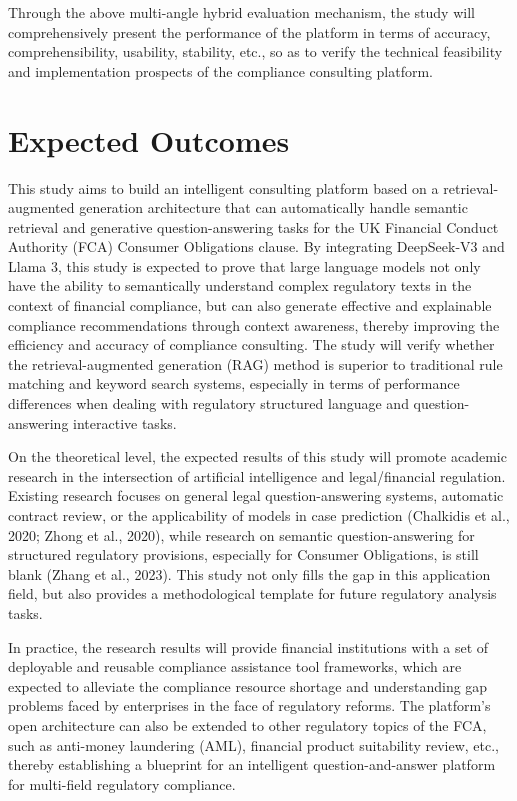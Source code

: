 \documentclass[a4paper,11pt]{article}
\begin{document}
Through the above multi-angle hybrid evaluation mechanism, the study will comprehensively present the performance of the platform in terms of accuracy, comprehensibility, usability, stability, etc., so as to verify the technical feasibility and implementation prospects of the compliance consulting platform.

\section{Expected Outcomes}

This study aims to build an intelligent consulting platform based on a retrieval-augmented generation architecture that can automatically handle semantic retrieval and generative question-answering tasks for the UK Financial Conduct Authority (FCA) Consumer Obligations clause. By integrating DeepSeek-V3 and Llama 3, this study is expected to prove that large language models not only have the ability to semantically understand complex regulatory texts in the context of financial compliance, but can also generate effective and explainable compliance recommendations through context awareness, thereby improving the efficiency and accuracy of compliance consulting. The study will verify whether the retrieval-augmented generation (RAG) method is superior to traditional rule matching and keyword search systems, especially in terms of performance differences when dealing with regulatory structured language and question-answering interactive tasks.

On the theoretical level, the expected results of this study will promote academic research in the intersection of artificial intelligence and legal/financial regulation. Existing research focuses on general legal question-answering systems, automatic contract review, or the applicability of models in case prediction (Chalkidis et al., 2020; Zhong et al., 2020), while research on semantic question-answering for structured regulatory provisions, especially for Consumer Obligations, is still blank (Zhang et al., 2023). This study not only fills the gap in this application field, but also provides a methodological template for future regulatory analysis tasks.

In practice, the research results will provide financial institutions with a set of deployable and reusable compliance assistance tool frameworks, which are expected to alleviate the compliance resource shortage and understanding gap problems faced by enterprises in the face of regulatory reforms. The platform's open architecture can also be extended to other regulatory topics of the FCA, such as anti-money laundering (AML), financial product suitability review, etc., thereby establishing a blueprint for an intelligent question-and-answer platform for multi-field regulatory compliance.
\end{document}
